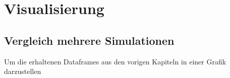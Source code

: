 \FloatBarrier
\section{Visualisierung}
\label{sec:implementation_visualization}

\FloatBarrier
\subsection{Vergleich mehrere Simulationen}
\label{sec:implementation_plotSimulation}
Um die erhaltenen Dataframes aus den vorigen Kapiteln in einer Grafik darzustellen 


